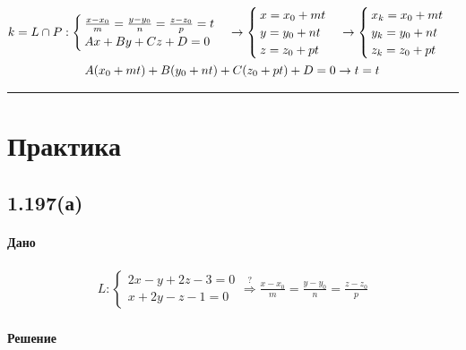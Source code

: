 \documentclass{article}
\begin{document}
\begin{gather*}
    k = L \cap P:
    \begin{cases}
        \frac{x - x_0}{m} = \frac{y - y_0}{n} = \frac{z - z_0}{p} = t \\
        Ax + By + Cz + D = 0
    \end{cases} \rightarrow
    \begin{cases}
        x = x_0 + mt \\
        y = y_0 + nt \\
        z = z_0 + pt
    \end{cases} \rightarrow
    \begin{cases}
        x_k = x_0 + mt_{\*} \\
        y_k = y_0 + nt_{\*} \\
        z_k = z_0 + pt_{\*}
    \end{cases} \\
    A(x_0 + mt) + B(y_0 + nt) + C(z_0 + pt) + D = 0 \rightarrow t = t_{\*}
\end{gather*}



\par\noindent\rule{\textwidth}{1pt}
\section{Практика}
\subsection{1.197(а)}

\paragraph{Дано}
\begin{gather*}
    L:
    \begin{cases}
        2x -  y + 2z - 3 = 0 \\
         x + 2y -  z - 1 = 0
    \end{cases} \overset{?}{\Rightarrow}
    \frac{x - x_0}{m} = \frac{y - y_0}{n} = \frac{z - z_0}{p}
\end{gather*}

\paragraph{Решение}
\end{document}
